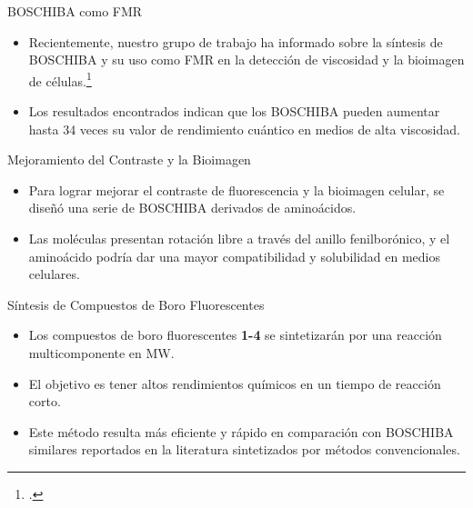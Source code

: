 \documentclass[%
spanish,
mexico]{beamer}
\begin{document}
\begin{frame}{BOSCHIBA como FMR}
    \begin{itemize}[<+- | alert@+>]
        \item Recientemente, nuestro grupo de trabajo ha informado sobre la síntesis de \gls{BOSCHIBA} y su uso como \gls{FMR} en la detección de viscosidad y la bioimagen de células.\footcite{ibarra-rodriguezFluorescentMolecularRotors2017}
        \item Los resultados encontrados indican que los \gls{BOSCHIBA} pueden aumentar hasta 34 veces su valor de rendimiento cuántico en medios de alta viscosidad.
    \end{itemize}
\end{frame}

\begin{frame}{Mejoramiento del Contraste y la Bioimagen}
    \begin{itemize}[<+- | alert@+>]
        \item Para lograr mejorar el contraste de fluorescencia y la bioimagen celular, se diseñó una serie de \gls{BOSCHIBA} derivados de aminoácidos.
        \item Las moléculas presentan rotación libre a través del anillo fenilborónico, y el aminoácido podría dar una mayor compatibilidad y solubilidad en medios celulares.
    \end{itemize}
\end{frame}

\begin{frame}{Síntesis de Compuestos de Boro Fluorescentes}
    \begin{itemize}[<+- | alert@+>]
        \item Los compuestos de boro fluorescentes \textbf{1-4} se sintetizarán por una reacción multicomponente en \gls{MW}.
        \item El objetivo es tener altos rendimientos químicos en un tiempo de reacción corto.
        \item Este método resulta más eficiente y rápido en comparación con \gls{BOSCHIBA} similares reportados en la literatura sintetizados por métodos convencionales.
    \end{itemize}
\end{frame}
\end{document}
